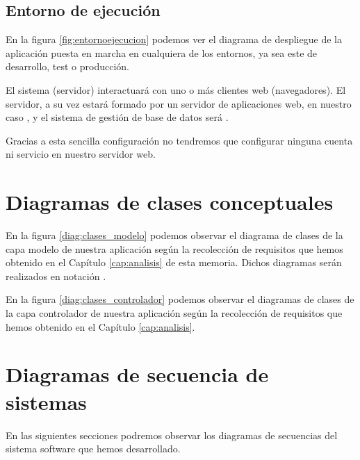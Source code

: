 \subsection{Entorno de ejecución}
En la figura \ref{fig:entornoejecucion} podemos ver el diagrama de despliegue de
la aplicación puesta en marcha en cualquiera de los entornos, ya sea este de
desarrollo, test o producción.


El sistema (servidor) interactuará con uno o más clientes web (navegadores). El
servidor, a su vez estará formado por un servidor de aplicaciones web, en
nuestro caso , y el sistema de gestión de base de datos será
.

Gracias a esta sencilla configuración no tendremos que configurar ninguna cuenta
ni servicio en nuestro servidor web.

\clearpage
\section{Diagramas de clases conceptuales}
En la figura \ref{diag:clases_modelo} podemos observar el diagrama de clases de
la capa modelo de nuestra aplicación según la recolección de requisitos que
hemos obtenido en el Capítulo \ref{cap:analisis} de esta memoria. Dichos
diagramas serán realizados en notación 
\cite{uml:distilled_standard}.


\clearpage

En la figura \ref{diag:clases_controlador} podemos observar el diagramas de
clases de la capa controlador de nuestra aplicación según la recolección de
requisitos que hemos obtenido en el Capítulo \ref{cap:analisis}.


\section{Diagramas de secuencia de sistemas}

En las siguientes secciones podremos observar los diagramas de secuencias del
sistema software que hemos desarrollado.

